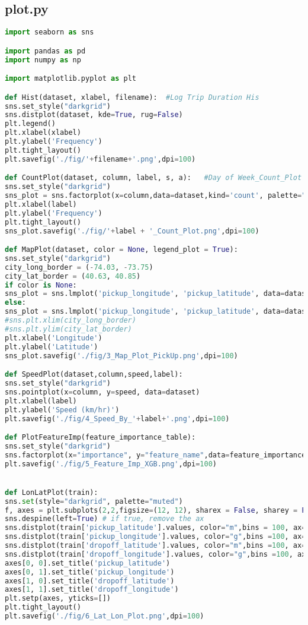 \documentclass[12pt,report]{ucdavisthesis}
\begin{document}
 \subsection{plot.py}
 \begin{lstlisting}[language=Python, caption=code3]  
import seaborn as sns

import pandas as pd
import numpy as np

import matplotlib.pyplot as plt

def Hist(dataset, xlabel, filename):  #Log Trip Duration His
sns.set_style("darkgrid")
sns.distplot(dataset, kde=True, rug=False)
plt.legend()
plt.xlabel(xlabel)
plt.ylabel('Frequency')
plt.tight_layout()
plt.savefig('./fig/'+filename+'.png',dpi=100)  

def CountPlot(dataset, column, label, s, a):   #Day of Week_Count_Plot
sns.set_style("darkgrid")
sns_plot = sns.factorplot(x=column,data=dataset,kind='count', palette="muted",size = s, aspect = a)
plt.xlabel(label)
plt.ylabel('Frequency')
plt.tight_layout()
sns_plot.savefig('./fig/'+label + '_Count_Plot.png',dpi=100)

def MapPlot(dataset, color = None, legend_plot = True):
sns.set_style("darkgrid")
city_long_border = (-74.03, -73.75)
city_lat_border = (40.63, 40.85)
if color is None:
sns_plot = sns.lmplot('pickup_longitude', 'pickup_latitude', data=dataset,fit_reg=False, scatter_kws={"s": 2.5}, legend =legend_plot)
else:
sns_plot = sns.lmplot('pickup_longitude', 'pickup_latitude', data=dataset,hue = color, fit_reg=False, scatter_kws={"s": 2.5}, legend =legend_plot)
#sns.plt.xlim(city_long_border)
#sns.plt.ylim(city_lat_border)
plt.xlabel('Longitude')
plt.ylabel('Latitude')
sns_plot.savefig('./fig/3_Map_Plot_PickUp.png',dpi=100)

def SpeedPlot(dataset,column,speed,label):
sns.set_style("darkgrid")
sns.pointplot(x=column, y=speed, data=dataset)
plt.xlabel(label)
plt.ylabel('Speed (km/hr)')
plt.savefig('./fig/4_Speed_By_'+label+'.png',dpi=100)

def PlotFeatureImp(feature_importance_table):
sns.set_style("darkgrid")
sns.factorplot(x="importance", y="feature_name",data=feature_importance_table, kind="bar")
plt.savefig('./fig/5_Feature_Imp_XGB.png',dpi=100)


def LonLatPlot(train):
sns.set(style="darkgrid", palette="muted")
f, axes = plt.subplots(2,2,figsize=(12, 12), sharex = False, sharey = False)#
sns.despine(left=True) # if true, remove the ax
sns.distplot(train['pickup_latitude'].values, color="m",bins = 100, ax=axes[0,0])
sns.distplot(train['pickup_longitude'].values, color="g",bins =100, ax=axes[0,1])
sns.distplot(train['dropoff_latitude'].values, color="m",bins =100, ax=axes[1,0])
sns.distplot(train['dropoff_longitude'].values, color="g",bins =100, ax=axes[1,1])
axes[0, 0].set_title('pickup_latitude')
axes[0, 1].set_title('pickup_longitude')
axes[1, 0].set_title('dropoff_latitude')
axes[1, 1].set_title('dropoff_longitude')
plt.setp(axes, yticks=[])
plt.tight_layout()
plt.savefig('./fig/6_Lat_Lon_Plot.png',dpi=100)


\end{lstlisting}
\end{document}
